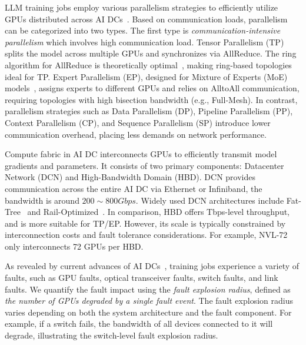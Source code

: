  LLM training jobs employ various parallelism strategies to efficiently utilize GPUs distributed across AI DCs~\cite{megatron-lm, zero}. Based on communication loads, parallelism can be categorized into two types. The first type is \textit{communication-intensive  parallelism} which involves high communication load. Tensor Parallelism (TP) splits the model across multiple GPUs and synchronizes via AllReduce. The ring algorithm for AllReduce is theoretically optimal~\cite{patarasuk2009bandwidth}, making ring-based topologies ideal for TP. Expert Parallelism (EP), designed for Mixture of Experts (MoE) models~\cite{hunyuanlarge,deepseekv3,mixtralexperts}, assigns experts to different GPUs and relies on AlltoAll communication, requiring topologies with high bisection bandwidth (e.g., Full-Mesh). In contrast, parallelism strategies such as Data Parallelism (DP), Pipeline Parallelism (PP), Context Parallelism (CP), and Sequence Parallelism (SP) introduce lower communication overhead, placing less  demands on network performance.



 Compute fabric in AI DC interconnects GPUs to efficiently transmit model gradients and parameters. It consists of two primary components: Datacenter Network (DCN) and High-Bandwidth Domain (HBD). 
DCN provides communication across the entire AI DC via Ethernet or Infiniband, the bandwidth is around $200\sim 800Gbps$. Widely used DCN architectures include Fat-Tree~\cite{sigcomm2008fattree} and Rail-Optimized~\cite{rail-optimized}. In comparison, HBD offers Tbps-level throughput, and is more suitable for TP/EP. However, its scale is typically constrained by interconnection costs and fault tolerance considerations. For example, NVL-72~\cite{nvl72} only interconnects 72 GPUs per HBD.



As revealed by current advances of AI DCs~\cite{sigcomm2024hpn, sigcomm2024rdmameta}, training jobs experience a variety of faults, such as GPU faults, optical transceiver faults, switch faults, and link faults. We quantify the fault impact using the \textit{fault explosion radius}, defined as \textit{the number of GPUs degraded by a single fault event}.
The fault explosion radius varies depending on both the system architecture and the fault component.
For example, if a switch fails, the bandwidth of all devices connected to it will degrade, illustrating the switch-level fault explosion radius.


